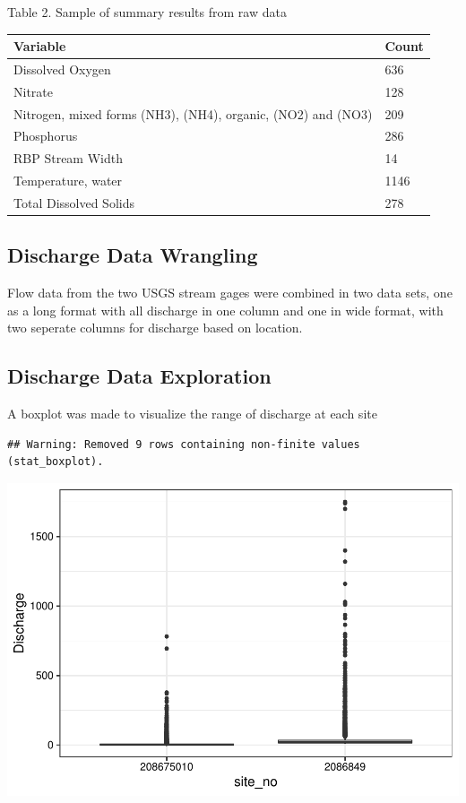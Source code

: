 \documentclass[12pt,]{article}
\begin{document}
Table 2. Sample of summary results from raw data

\begin{longtable}[]{@{}ll@{}}
\toprule
Variable & Count\tabularnewline
\midrule
\endhead
Dissolved Oxygen & 636\tabularnewline
Nitrate & 128\tabularnewline
Nitrogen, mixed forms (NH3), (NH4), organic, (NO2) and (NO3) &
209\tabularnewline
Phosphorus & 286\tabularnewline
RBP Stream Width & 14\tabularnewline
Temperature, water & 1146\tabularnewline
Total Dissolved Solids & 278\tabularnewline
\bottomrule
\end{longtable}

\hypertarget{discharge-data-wrangling}{%
\subsection{Discharge Data Wrangling}\label{discharge-data-wrangling}}

Flow data from the two USGS stream gages were combined in two data sets,
one as a long format with all discharge in one column and one in wide
format, with two seperate columns for discharge based on location.

\hypertarget{discharge-data-exploration}{%
\subsection{Discharge Data
Exploration}\label{discharge-data-exploration}}

A boxplot was made to visualize the range of discharge at each site

\begin{verbatim}
## Warning: Removed 9 rows containing non-finite values (stat_boxplot).
\end{verbatim}

\includegraphics{Landman_ENV872_Project_files/figure-latex/unnamed-chunk-1-1.pdf}
\end{document}
